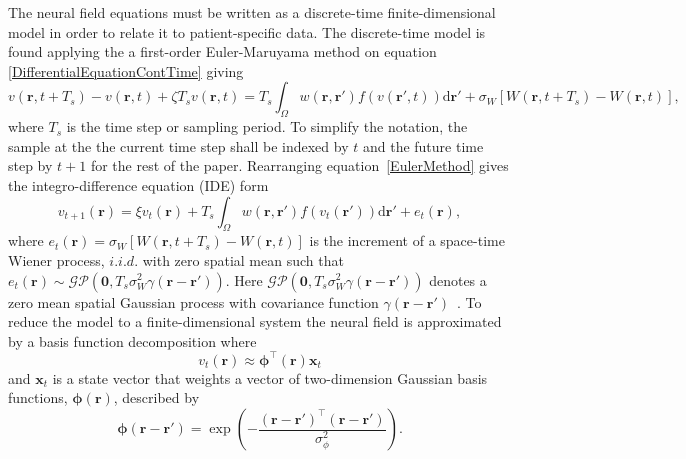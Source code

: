 \documentclass[]{article}
\begin{document}
The neural field equations must be written as a discrete-time finite-dimensional model in order to relate it to patient-specific data. The discrete-time model is found applying the a first-order Euler-Maruyama method on equation \ref{DifferentialEquationContTime} giving
\begin{equation}\label{EulerMethod}
	v\left( \mathbf{r},t+T_s \right)-v\left( \mathbf{r},t \right) + \zeta T_sv\left(\mathbf{r},t \right) = T_s\int_\Omega {w\left( \mathbf{r},\mathbf{r}' \right) f\left( {v\left( \mathbf{r}',t \right)}\right)\textrm{d}\mathbf{r}'} + 	\sigma_W[W\left( \mathbf{r},t+T_s \right)-W\left( \mathbf{r},t \right)],
\end{equation}
where $T_s$ is the time step or sampling period. To simplify the notation, the sample at the the current time step shall be indexed by $t$ and the future time step by $t+1$ for the rest of the paper. Rearranging equation~\ref{EulerMethod} gives the integro-difference equation (IDE) form
\begin{equation}
	\label{NoisyDiscreteTimeModel} 
	v_{t+1}\left(\mathbf{r}\right) = 
	\xi v_t\left(\mathbf{r}\right) + 
	T_s \int_\Omega { 
	    w\left(\mathbf{r},\mathbf{r}'\right)
	    f\left(v_t\left(\mathbf{r}'\right)\right) 
	\textrm{d}\mathbf{r}'} 
	+ e_t\left(\mathbf{r}\right), 
\end{equation}
where $e_t(\mathbf{r}) = \sigma_W[W\left( \mathbf{r},t+T_s \right)-W\left( \mathbf{r},t \right)]$ is the increment of a space-time Wiener process, $i.i.d.$ with zero spatial mean such that $e_t(\mathbf{r})\sim\mathcal{GP}(\mathbf 0,T_s\sigma_W^2\gamma(\mathbf{r}-\mathbf{r}'))$. Here $\mathcal{GP}(\mathbf 0,T_s\sigma_W^2\gamma(\mathbf{r}-\mathbf{r}'))$ denotes a zero mean spatial Gaussian process with covariance function $\gamma(\mathbf{r}-\mathbf{r}')$~\cite{Rasmussen2005}.
To reduce the model to a finite-dimensional system the neural field is approximated by a basis function decomposition where
\begin{equation}
	\label{DefFieldDecomp} v_t\left(\mathbf{r}\right) \approx \boldsymbol{\phi}^{\top}\left(\mathbf{r}\right) \mathbf{x}_t 
\end{equation}
and $\mathbf{x}_t$ is a state vector that weights a vector of two-dimension Gaussian basis functions, $\boldsymbol{\phi}(\mathbf{r})$, described by
\begin{equation}\label{eq:FieldBasisFunction}
	\boldsymbol\phi\left(\mathbf{r}-\mathbf{r}'\right) =
\exp{\left(-\frac{(\mathbf{r}-\mathbf{r}')^\top(\mathbf{r}-\mathbf{r}')}{\sigma_{\phi}^2}\right)}. 
\end{equation}
\end{document}
